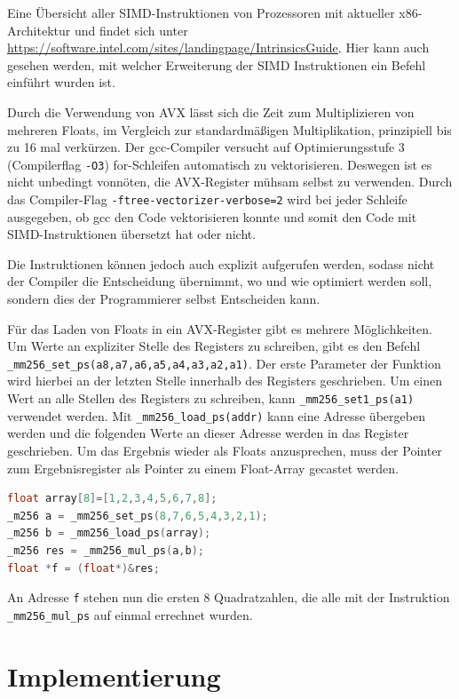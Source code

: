 \documentclass[../main.tex]{subfiles}
\begin{document}
Eine Übersicht aller SIMD-Instruktionen von Prozessoren mit aktueller x86-Architektur und findet sich unter \url{https://software.intel.com/sites/landingpage/IntrinsicsGuide}. Hier kann auch gesehen werden, mit welcher Erweiterung der SIMD Instruktionen ein Befehl einführt wurden ist.

Durch die Verwendung von AVX lässt sich die Zeit zum Multiplizieren von mehreren Floats, im Vergleich zur standardmäßigen Multiplikation, prinzipiell bis zu 16 mal verkürzen. Der gcc-Compiler versucht auf Optimierungsstufe 3 (Compilerflag \texttt{-O3}) for-Schleifen automatisch zu vektorisieren. Deswegen ist es nicht unbedingt vonnöten, die AVX-Register mühsam selbst zu verwenden. Durch das Compiler-Flag \texttt{-ftree-vectorizer-verbose=2} wird bei jeder Schleife ausgegeben, ob gcc den Code vektorisieren konnte und somit den Code mit SIMD-Instruktionen übersetzt hat oder nicht.

Die Instruktionen können jedoch auch explizit aufgerufen werden, sodass nicht der Compiler die Entscheidung übernimmt, wo und wie optimiert werden soll, sondern dies der Programmierer selbst Entscheiden kann. 

Für das Laden von Floats in ein AVX-Register gibt es mehrere Möglichkeiten. Um Werte an expliziter Stelle des Registers zu schreiben, gibt es den Befehl \texttt{\_mm256\_set\_ps(a8,a7,a6,a5,a4,a3,a2,a1)}. Der erste Parameter der Funktion wird hierbei an der letzten Stelle innerhalb des Registers geschrieben. Um einen Wert an alle Stellen des Registers zu schreiben, kann \texttt{\_mm256\_set1\_ps(a1)} verwendet werden. Mit \texttt{\_mm256\_load\_ps(addr)} kann eine Adresse übergeben werden und die folgenden Werte an dieser Adresse werden in das Register geschrieben. 
Um das Ergebnis wieder als Floats anzusprechen, muss der Pointer zum Ergebnisregister als Pointer zu einem Float-Array gecastet werden.

\begin{lstlisting}[language=c++, caption=Multiplikation mit AVX, captionpos=b, label=listing:avx_multiplikation, frame=single, linewidth=\textwidth, breaklines=true]
float array[8]=[1,2,3,4,5,6,7,8];
_m256 a = _mm256_set_ps(8,7,6,5,4,3,2,1);
_m256 b = _mm256_load_ps(array);
_m256 res = _mm256_mul_ps(a,b);
float *f = (float*)&res;
\end{lstlisting}
An Adresse \texttt{f} stehen nun die ersten 8 Quadratzahlen, die alle mit der Instruktion \texttt{\_mm256\_mul\_ps} auf einmal errechnet wurden.


\section{Implementierung}
\end{document}
